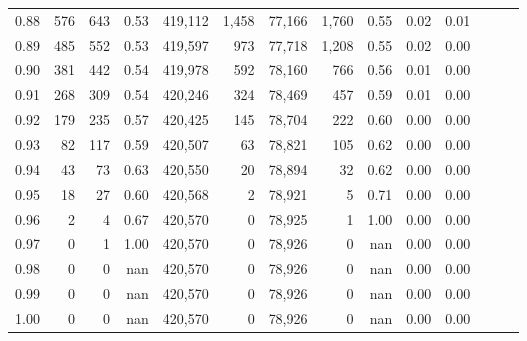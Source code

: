 \begin{tabular}{rrrrrrrrrrrrrr}
0.88 &     576 &    643 &  0.53 &  419,112 &    1,458 &  77,166 &   1,760 &  0.55 &  0.02 &      0.01 \\
0.89 &     485 &    552 &  0.53 &  419,597 &      973 &  77,718 &   1,208 &  0.55 &  0.02 &      0.00 \\
0.90 &     381 &    442 &  0.54 &  419,978 &      592 &  78,160 &     766 &  0.56 &  0.01 &      0.00 \\
0.91 &     268 &    309 &  0.54 &  420,246 &      324 &  78,469 &     457 &  0.59 &  0.01 &      0.00 \\
0.92 &     179 &    235 &  0.57 &  420,425 &      145 &  78,704 &     222 &  0.60 &  0.00 &      0.00 \\
0.93 &      82 &    117 &  0.59 &  420,507 &       63 &  78,821 &     105 &  0.62 &  0.00 &      0.00 \\
0.94 &      43 &     73 &  0.63 &  420,550 &       20 &  78,894 &      32 &  0.62 &  0.00 &      0.00 \\
0.95 &      18 &     27 &  0.60 &  420,568 &        2 &  78,921 &       5 &  0.71 &  0.00 &      0.00 \\
0.96 &       2 &      4 &  0.67 &  420,570 &        0 &  78,925 &       1 &  1.00 &  0.00 &      0.00 \\
0.97 &       0 &      1 &  1.00 &  420,570 &        0 &  78,926 &       0 &   nan &  0.00 &      0.00 \\
0.98 &       0 &      0 &   nan &  420,570 &        0 &  78,926 &       0 &   nan &  0.00 &      0.00 \\
0.99 &       0 &      0 &   nan &  420,570 &        0 &  78,926 &       0 &   nan &  0.00 &      0.00 \\
1.00 &       0 &      0 &   nan &  420,570 &        0 &  78,926 &       0 &   nan &  0.00 &      0.00 \\
\bottomrule
\end{tabular}
